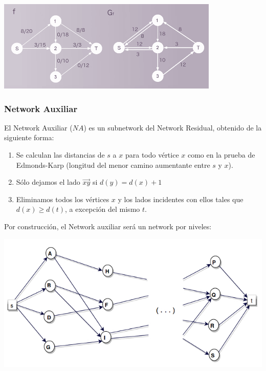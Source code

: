 \documentclass[10pt,a4paper]{article}
\begin{document}
\begin{center}

    \begin{adjustbox}{max size={\textwidth}{\textheight}}
        \includegraphics{definitions/NR.png}
        \end{adjustbox}
    
\end{center}

\subsubsection*{Network Auxiliar}

El Network Auxiliar ($NA$) es un subnetwork del Network Residual, obtenido de la siguiente forma:

\begin{enumerate}

	\item Se calculan las distancias de $s$ a $x$ para todo vértice $x$ como en la prueba de Edmonds-Karp (longitud del menor camino aumentante entre $s$ y $x$).
	\item Sólo dejamos el lado $\overrightarrow{xy}$ si $d(y) = d(x) + 1$
	\item Eliminamos todos los vértices $x$ y los lados incidentes con ellos tales que $d(x) \geq d(t)$, a excepción del mismo $t$.
\end{enumerate}

Por construcción, el Network auxiliar será un network por niveles:

\begin{center}

    \begin{adjustbox}{max size={\textwidth}{\textheight}}
        \includegraphics{definitions/dinic_1.jpg}
        \end{adjustbox}
    
\end{center}
\end{document}
